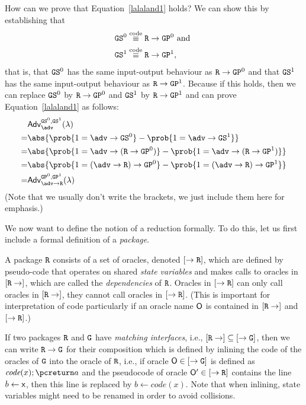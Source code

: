 How can we prove that Equation~\ref{lalaland1} holds? We can show this by establishing that
\begin{align}
\notag          &\text{\texttt{GS}}^0\stackrel{\text{code}}{\equiv}\text{\texttt{R}}\rightarrow\text{\texttt{GP}}^0\text{ and }\\
\label{lalaland}&\text{\texttt{GS}}^1\stackrel{\text{code}}{\equiv}\text{\texttt{R}}\rightarrow\text{\texttt{GP}}^1,
\end{align}
that is, that $\text{\texttt{GS}}^0$ has the same input-output behaviour as $\text{\texttt{R}}\rightarrow\text{\texttt{GP}}^0$
and that $\text{\texttt{GS}}^1$ has the same input-output behaviour as $\text{\texttt{R}}\rightarrow\text{\texttt{GP}}^1$.
Because if this holds, then we can replace $\text{\texttt{GS}}^0$ by $\text{\texttt{R}}\rightarrow\text{\texttt{GP}}^0$
and $\text{\texttt{GS}}^1$ by $\text{\texttt{R}}\rightarrow\text{\texttt{GP}}^1$ and can prove Equation~\ref{lalaland1} as follows:
\begin{align*}
&\mathsf{Adv}^{\M{GS}^0,\M{GS}^1}_\adv(\lambda)\\
=&\abs{\prob{1=\adv\rightarrow\M{GS}^0}-\prob{1=\adv\rightarrow\M{GS}^1}}\\
=&\abs{\prob{1=\adv\rightarrow(\M{R}\rightarrow\M{GP}^0)}-\prob{1=\adv\rightarrow(\M{R}\rightarrow\M{GP}^1)}}\\
=&\abs{\prob{1=(\adv\rightarrow\M{R})\rightarrow\M{GP}^0}-\prob{1=(\adv\rightarrow\M{R})\rightarrow\M{GP}^1}}\\
=&\mathsf{Adv}^{\M{GP}^0,\M{GP}^1}_{\adv\rightarrow\M{R}}(\lambda)
\end{align*}
(Note that we usually don't write the brackets, we just include them here for emphasis.)

We now want to define the notion of a reduction formally. To do this, let us first include a formal definition of 
a \emph{package}.
\begin{definition}[Package]
A package $\text{\texttt{R}}$ consists of a set of oracles, denoted $[\rightarrow \text{\texttt{R}}]$,
which are defined by pseudo-code that operates on shared \emph{state variables} and makes calls to oracles in $[\text{\texttt{R}}\rightarrow]$,
which are called the \emph{dependencies} of $\text{\texttt{R}}$. Oracles in $[\rightarrow \text{\texttt{R}}]$
can only call oracles in $[\text{\texttt{R}}\rightarrow]$, they cannot call oracles in $[\rightarrow \text{\texttt{R}}]$.
(This is important for interpretation of code particularly if an oracle name $\mathsf{O}$ is contained 
in $[\text{\texttt{R}}\rightarrow]$ and $[\rightarrow \text{\texttt{R}}]$.)
\end{definition}
\begin{definition}
If two packages $\text{\texttt{R}}$ and $\text{\texttt{G}}$ have \emph{matching interfaces}, i.e.,
$[\text{\texttt{R}}\rightarrow]\subseteq[\rightarrow\text{\texttt{G}}]$, then we can write
$\text{\texttt{R}}\rightarrow\text{\texttt{G}}$ for their composition which is defined by
inlining the code of the oracles of $\text{\texttt{G}}$ into the oracle of $\text{\texttt{R}}$,
i.e., if oracle $\mathsf{O}\in[\rightarrow\text{\texttt{G}}]$ is defined as $\textit{code}(x);\pcreturn a$
and the pseudocode of oracle $\mathsf{O}'\in[\rightarrow\text{\texttt{R}}]$ contains the line
$b\gets \mathsf{x}$, then this line is replaced by $b\gets\textit{code}(x)$. Note that
when inlining, state variables might need to be renamed in order to avoid collisions.
\end{definition}

